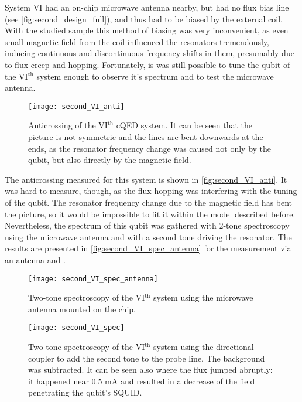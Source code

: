 \documentclass[12pt, twoside]{report}
\numberwithin{equation}{section}
\begin{document}
System VI had an on-chip microwave antenna nearby, but had no flux bias line (see \autoref{fig:second_design_full}), and thus had to be biased by the external coil. With the studied sample this method of biasing was very inconvenient, as even small magnetic field from the coil influenced the resonators tremendously, inducing continuous and discontinuous frequency shifts in them, presumably due to flux creep and hopping. Fortunately, is was still possible to tune the qubit of the VI$^{\text{th}}$ system enough to observe it's spectrum and to test the microwave antenna.

\begin{figure}
\centering
\texttt{[image: second\_VI\_anti]}
\caption{Anticrossing of the VI$^{\text{th}}$ cQED system. It can be seen that the picture is not symmetric and   the lines are bent downwards at the ends, as the resonator frequency change was caused not only by the qubit, but also directly by the magnetic field.}
\label{fig:second_VI_anti}
\end{figure}

The anticrossing measured for this system is shown in \autoref{fig:second_VI_anti}. It was hard to measure, though, as the flux hopping was interfering with the tuning of the qubit. The resonator frequency change due to the magnetic field has bent the picture, so it would be impossible to fit it within the model described before. Nevertheless, the spectrum of this qubit was gathered with 2-tone spectroscopy using the microwave antenna and with a second tone driving the resonator. The results are presented in \autoref{fig:second_VI_spec_antenna} for the measurement via an antenna and .

\begin{figure}[h]
\texttt{[image: second\_VI\_spec\_antenna]}
\caption{Two-tone spectroscopy of the VI$^{\text{th}}$ system using the microwave antenna mounted on the chip.}
\label{fig:second_VI_spec_antenna}
\end{figure}

\begin{figure}[h]
\texttt{[image: second\_VI\_spec]}
\caption{Two-tone spectroscopy of the VI$^{\text{th}}$ system using the directional coupler to add the second tone to the probe line. The background was subtracted. It can be seen also where the flux jumped abruptly: it happened near 0.5 mA and resulted in a decrease of the field penetrating the qubit's SQUID.}
\label{fig:second_VI_spec_antenna}
\end{figure}
\end{document}
